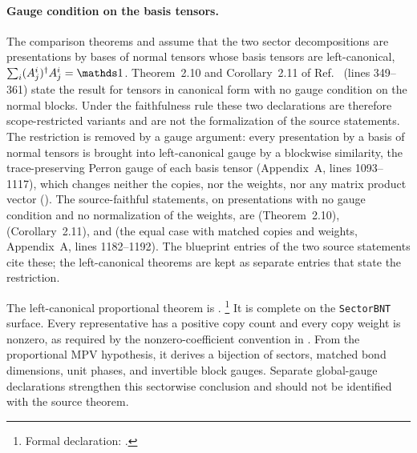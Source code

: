 \documentclass{article}
\begin{document}
\paragraph{Gauge condition on the basis tensors.}
The comparison theorems
 and
 assume that the two
sector decompositions are presentations by bases of normal tensors whose basis
tensors are left-canonical, $\sum_i (A_j^i)^\dagger A_j^i=\Id$. Theorem~2.10
and Corollary~2.11 of Ref.~\cite{Cirac2016MPDO_arXiv} (lines 349--361) state
the result for tensors in canonical form with no gauge condition on the
normal blocks. Under the faithfulness rule these two declarations are
therefore scope-restricted variants and are not the formalization of the
source statements. The restriction is removed by a gauge argument: every
presentation by a basis of normal tensors is brought into left-canonical gauge
by a blockwise similarity, the trace-preserving Perron gauge of each basis
tensor (Appendix~A, lines 1093--1117), which changes neither the copies, nor
the weights, nor any matrix product vector
().
The source-faithful statements, on presentations with no gauge condition and
no normalization of the weights, are
(Theorem~2.10),
(Corollary~2.11), and
 (the equal case
with matched copies and weights, Appendix~A, lines 1182--1192). The blueprint
entries of the two source statements cite these; the left-canonical theorems
are kept as separate entries that state the restriction.

The left-canonical proportional theorem is
.%
\footnote{Formal declaration:
    .}
It is complete on the \texttt{SectorBNT} surface. Every representative has a
positive copy count and every copy weight is nonzero, as required by the
nonzero-coefficient convention in
. From the
proportional MPV hypothesis, it derives a bijection of sectors, matched bond
dimensions, unit phases, and invertible block gauges. Separate global-gauge
declarations strengthen this sectorwise conclusion and should not be
identified with the source theorem.
\end{document}

